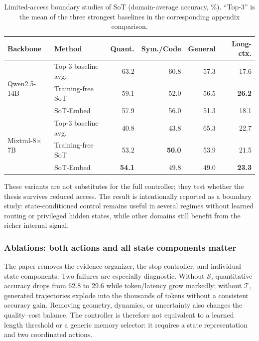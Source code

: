 \documentclass[12pt,a4paper]{article}
\newcommand{\method}[1]{{\sffamily\bfseries\color{MethodBlue}#1}}
\newcommand{\XDB}{\method{XDomainBench}}
\newcommand{\SubspacePath}{\method{SubspacePath Pruner}}
\newcommand{\SoT}{\method{SoT}}
\newcommand{\LoTR}{\method{LoTR}}
\newcommand{\EtoE}{\method{E2E-Merge}}
\def\method#1{#1}\def\XDB{XDomainBench}\def\SubspacePath{SubspacePath Pruner}%
\def\SoT{SoT}\def\LoTR{LoTR}\def\EtoE{E2E-Merge}%
\begin{document}
\begin{table}[tbp]
\centering\singlespacing\scriptsize
\caption{Limited-access boundary studies of \SoT{} (domain-average accuracy, \%). ``Top-3'' is the mean of the three strongest baselines in the corresponding appendix comparison.}
\label{tab:sot-boundary}
\setlength{\tabcolsep}{3.6pt}\renewcommand{\arraystretch}{1.04}
\begin{tabular}{llrrrr}
\toprule
\textbf{Backbone} & \textbf{Method} & \textbf{Quant.} & \textbf{Sym./Code} & \textbf{General} & \textbf{Long-ctx.}\\
\midrule
\multirow{3}{*}{Qwen2.5-14B} & Top-3 baseline avg. & 63.2 & 60.8 & 57.3 & 17.6\\
& Training-free SoT & 59.1 & 52.0 & 56.5 & \textbf{26.2}\\
& SoT-Embed & 57.9 & 56.0 & 51.3 & 18.1\\
\midrule
\multirow{3}{*}{Mixtral-8$\times$7B} & Top-3 baseline avg. & 40.8 & 43.8 & 65.3 & 22.7\\
& Training-free SoT & 53.2 & \textbf{50.0} & 53.9 & 21.5\\
& SoT-Embed & \textbf{54.1} & 49.8 & 49.0 & \textbf{23.3}\\
\bottomrule
\end{tabular}
\end{table}

These variants are not substitutes for the full controller; they test whether the thesis survives reduced access. The result is intentionally reported as a boundary study: state-conditioned control remains useful in several regimes without learned routing or privileged hidden states, while other domains still benefit from the richer internal signal.

\subsubsection{Ablations: both actions and all state components matter}
The paper removes the evidence organizer, the stop controller, and individual state components. Two failures are especially diagnostic. Without $\mathcal S$, quantitative accuracy drops from 62.8 to 29.6 while token/latency grow markedly; without $\mathcal T$, generated trajectories explode into the thousands of tokens without a consistent accuracy gain. Removing geometry, dynamics, or uncertainty also changes the quality--cost balance. The controller is therefore not equivalent to a learned length threshold or a generic memory selector: it requires a state representation and two coordinated actions.
\end{document}
